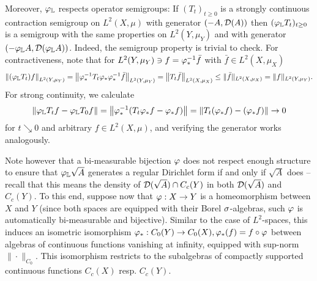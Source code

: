 Moreover, $\varphi_{\mathbb{L}}$ respects operator semigroups: If $(T_t)_{t\geq0}$ is a strongly continuous contraction semigroup on $L^2(X,\mu)$ with generator $(-A,\mathcal{D}(A))$ then $(\varphi_{\mathbb{L}} T_t)_{t\geq0}$ is a semigroup with the same properties on $L^2(Y,\mu_Y)$ and with generator $(-\varphi_{\mathbb{L}} A,\mathcal{D}(\varphi_{\mathbb{L}} A))$. Indeed, the semigroup property is trivial to check. For contractiveness, note that for $L^2(Y,\mu_Y)\ni f=\varphi_*^{-1}\bar f$ with 
$\bar f\in L^2(X,\mu_X)$
\[
  \left\|(\varphi_{\mathbb{L}}T_t)f\right\|_{L^2(Y,\mu_Y)}
  =\left\|\varphi_*^{-1}T_t\varphi_*\varphi_*^{-1}\bar f\right\|_{L^2(Y,\mu_Y)}
  =\left\|T_t\bar f\right\|_{L^2(X,\mu_X)}
  \leq\|\bar f\|_{L^2(X,\mu_X)}=\|f\|_{L^2(Y,\mu_Y)}.
\]
For strong continuity, we calculate
\[
  \left\|\varphi_{\mathbb{L}} T_t f-\varphi_{\mathbb{L}} T_0 f\right\|
  =\left\|\varphi_*^{-1}(T_t\varphi_*f-\varphi_*f)\right\|
  =\left\|T_t(\varphi_*f)-(\varphi_*f)\right\| \to 0
\]
for $t\searrow 0$ and arbitrary $f\in L^2(X,\mu)$, and verifying the generator works analogously. 

Note however that a bi-measurable bijection $\varphi$ does not respect enough structure to ensure that 
$\varphi_{\mathbb{L}} \sqrt{A}$ generates a regular Dirichlet form if and only if $\sqrt{A}$ does -- recall that this means the density of $\mathcal{D}(\sqrt{A})\cap C_c(Y)$ in both $\mathcal{D}(\sqrt{A})$ and $C_c(Y)$. To this end, suppose now that $\varphi:X\to Y$ is a homeomorphism between $X$ and $Y$ (since both spaces are equipped with their Borel $\sigma$-algebras, such $\varphi$ is automatically bi-measurable and bijective). Similar to the case of $L^2$-spaces, this induces an isometric isomorphism $\varphi_*:C_0(Y)\to C_0(X), \varphi_*(f)=f\circ\varphi$ between algebras of continuous functions vanishing at infinity, equipped with sup-norm $\|\cdot\|_{C_0}$. This isomorphism restricts to the subalgebras of compactly supported continuous functions $C_c(X)$ resp. $C_c(Y)$. 

